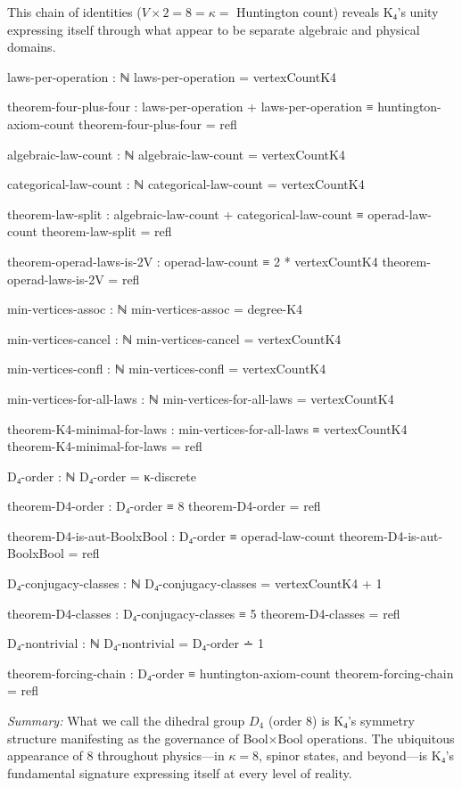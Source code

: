 \documentclass[11pt,a4paper]{book}
\begin{document}
This chain of identities ($V \times 2 = 8 = \kappa = $ Huntington count) reveals K₄'s unity expressing itself through what appear to be separate algebraic and physical domains.

\begin{code}
laws-per-operation : ℕ
laws-per-operation = vertexCountK4

theorem-four-plus-four : laws-per-operation + laws-per-operation ≡ huntington-axiom-count
theorem-four-plus-four = refl

algebraic-law-count : ℕ
algebraic-law-count = vertexCountK4

categorical-law-count : ℕ
categorical-law-count = vertexCountK4

theorem-law-split : algebraic-law-count + categorical-law-count ≡ operad-law-count
theorem-law-split = refl

theorem-operad-laws-is-2V : operad-law-count ≡ 2 * vertexCountK4
theorem-operad-laws-is-2V = refl

min-vertices-assoc : ℕ
min-vertices-assoc = degree-K4

min-vertices-cancel : ℕ
min-vertices-cancel = vertexCountK4

min-vertices-confl : ℕ
min-vertices-confl = vertexCountK4

min-vertices-for-all-laws : ℕ
min-vertices-for-all-laws = vertexCountK4

theorem-K4-minimal-for-laws : min-vertices-for-all-laws ≡ vertexCountK4
theorem-K4-minimal-for-laws = refl

D₄-order : ℕ
D₄-order = κ-discrete

theorem-D4-order : D₄-order ≡ 8
theorem-D4-order = refl

theorem-D4-is-aut-BoolxBool : D₄-order ≡ operad-law-count
theorem-D4-is-aut-BoolxBool = refl

D₄-conjugacy-classes : ℕ
D₄-conjugacy-classes = vertexCountK4 + 1

theorem-D4-classes : D₄-conjugacy-classes ≡ 5
theorem-D4-classes = refl

D₄-nontrivial : ℕ
D₄-nontrivial = D₄-order ∸ 1

theorem-forcing-chain : D₄-order ≡ huntington-axiom-count
theorem-forcing-chain = refl
\end{code}

\medskip
\noindent\textit{Summary:} What we call the dihedral group $D_4$ (order 8) is K₄'s symmetry structure manifesting as the governance of Bool$\times$Bool operations. The ubiquitous appearance of 8 throughout physics—in $\kappa = 8$, spinor states, and beyond—is K₄'s fundamental signature expressing itself at every level of reality.
\end{document}
